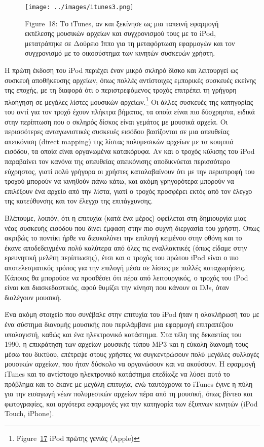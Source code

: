\documentclass[
]{article}
\begin{document}
\leavevmode{}%
\begin{figure}
\hypertarget{fig:itunes3}{%
\centering
\texttt{[image: ../images/itunes3.png]}
\caption{Figure~18: Το iTunes, αν και ξεκίνησε ως μια ταπεινή εφαρμογή
εκτέλεσης μουσικών αρχείων και συγχρονισμού τους με το iPod, μετατράπηκε
σε Δούρειο Ίππο για τη μεταφόρτωση εφαρμογών και τον συγχρονισμό με το
οικοσύστημα των κινητών συσκευών χρήστη.}\label{fig:itunes3}
}
\end{figure}

Η πρώτη έκδοση του iPod περιέχει έναν μικρό σκληρό δίσκο και λειτουργεί
ως συσκευή αποθήκευσης αρχείων, όπως πολλές αντίστοιχες εμπορικές
συσκευές εκείνης της εποχής, με τη διαφορά ότι ο περιστρεφόμενος τροχός
επιτρέπει τη γρήγορη πλοήγηση σε μεγάλες λίστες μουσικών
αρχείων.\footnote{Figure~\protect\hyperlink{fig:ipod_1g}{17} iPod πρώτης
  γενιάς (Apple)} Οι άλλες συσκευές της κατηγορίας του αντί για τον
τροχό έχουν πλήκτρα βήματος, τα οποία είναι πιο δύσχρηστα, ειδικά στην
περίπτωση που ο σκληρός δίσκος είναι γεμάτος με μουσικά αρχεία. Οι
περισσότερες ανταγωνιστικές συσκευές εισόδου βασίζονται σε μια απευθείας
απεικόνιση (direct mapping) της λίστας πολυμεσικών αρχείων με τα κουμπιά
εισόδου, τα οποία είναι οργανωμένα κατακόρυφα. Αν και ο τροχός κύλισης
του iPod παραβαίνει τον κανόνα της απευθείας απεικόνισης αποδικνύεται
περισσότερο εύχρηστος, γιατί πολύ γρήγορα οι χρήστες καταλαβαίνουν ότι
με την περιστροφή του τροχού μπορούν να κινηθούν πάνω-κάτω, και ακόμη
γρηγορότερα μπορούν να επιλέξουν ένα αρχείο από την λίστα, γιατί ο
τροχός προσφέρει εκτός από τον έλεγχο της κατεύθυνσης και τον έλεγχο της
επιτάγχυνσης.

Βλέπουμε, λοιπόν, ότι η επιτυχία (κατά ένα μέρος) οφείλεται στη
δημιουργία μιας νέας συσκευής εισόδου που δίνει έμφαση στην πιο συχνή
διεργασία του χρήστη. Όπως ακριβώς το ποντίκι ήρθε να διευκολύνει την
επιλογή κειμένου στην οθόνη και το έκανε αποδεδειγμένα πολύ καλύτερα από
όλες τις εναλλακτικές (όπως είδαμε στην ερευνητική μελέτη περίπτωσης),
έτσι και ο τροχός του πρώτου iPod είναι ο πιο αποτελεσματικός τρόπος για
την επιλογή μέσα σε λίστες με πολλές καταχωρήσεις. Κάποιος θα μπορούσε
να προσθέσει ότι πέρα από λειτουργικός, ο τροχός του iPod είναι και
διασκεδαστικός, αφού θυμίζει την κίνηση που κάνουν οι DJs, όταν
διαλέγουν μουσική.

Ένα ακόμη στοιχείο που συνέβαλε στην επιτυχία του iPod ήταν η ολοκλήρωσή
του με ένα σύστημα διανομής μουσικής που περιλάμβανε μια εφαρμογή
επιτραπέζιου υπολογιστή, καθώς και ένα ηλεκτρονικό κατάστημα. Στα τέλη
της δεκαετίας του 1990, η επικράτηση των αρχείων μουσικής τύπου MP3 και
η εύκολη διανομή τους μέσω του δικτύου, επέτρεψε στους χρήστες να
συγκεντρώσουν πολύ μεγάλες συλλογές μουσικών αρχείων, που ήταν δύσκολο
να οργανώσουν και να ακούσουν. Η εφαρμογή iTunes και το αντίστοιχο
ηλεκτρονικό κατάστημα επεδίωξε να λύσει αυτό το πρόβλημα και το έκανε με
μεγάλη επιτυχία, ενώ ταυτόχρονα το iTunes έγινε η πύλη για την εισαγωγή
νέων πολυμεσικών αρχείων πέρα από τη μουσική, όπως βίντεο και
φωτογραφίες, και αργότερα εφαρμογές για την κατηγορία των έξυπνων
κινητών (iPod Touch, iPhone).
\end{document}
